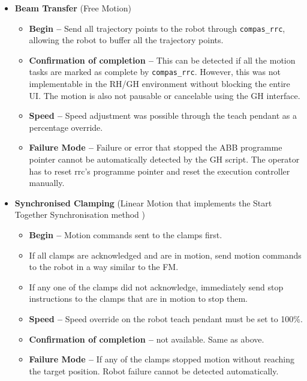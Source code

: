 \begin{itemize}[nosep]
\item \textbf{Beam Transfer}  (Free Motion)
    \begin{itemize}
        \item \textbf{Begin --} Send all trajectory points to the robot through \verb|compas_rrc|, allowing the robot to buffer all the trajectory points. 
        \item \textbf{Confirmation of completion --} This can be detected if all the motion tasks are marked as complete by \verb|compas_rrc|. However, this was not implementable in the RH/GH environment without blocking the entire UI. The motion is also not pausable or cancelable using the GH interface.
        \item \textbf{Speed --} Speed adjustment was possible through the teach pendant as a percentage override.
        \item \textbf{Failure Mode --} Failure or error that stopped the ABB programme pointer cannot be automatically detected by the GH script. The operator has to reset rrc’s programme pointer and reset the execution controller manually.
    \end{itemize}
    \item \textbf{Synchronised Clamping}  (Linear Motion that implements the Start Together Synchronisation method )
    \begin{itemize}
        \item \textbf{Begin --} Motion commands sent to the clamps first.
        \item If all clamps are acknowledged and are in motion, send motion commands to the robot in a way similar to the FM.
        \item If any one of the clamps did not acknowledge, immediately send stop instructions to the clamps that are in motion to stop them. 
        \item \textbf{Speed --} Speed override on the robot teach pendant must be set to 100\%.
        \item \textbf{Confirmation of completion --} not available. Same as above.
        \item \textbf{Failure Mode --} If any of the clamps stopped motion without reaching the target position. Robot failure cannot be detected automatically.
    \end{itemize}
\end{itemize}

